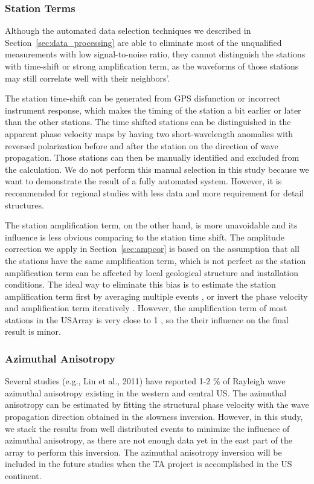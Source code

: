 \documentclass[referee]{gji}
\begin{document}
\subsubsection{Station Terms}

Although the automated data selection techniques we described in Section~\ref{sec:data_processing} are able to eliminate most of the unqualified measurements with low signal-to-noise ratio, they cannot distinguish the stations with time-shift or strong amplification term, as the waveforms of those stations may still correlate well with their neighbors’. 

The station time-shift can be generated from GPS disfunction or incorrect instrument response, which makes the timing of the station a bit earlier or later than the other stations. The time shifted stations can be distinguished in the apparent phase velocity maps by having two short-wavelength anomalies with reversed polarization before and after the station on the direction of wave propagation. Those stations can then be manually identified and excluded from the calculation. We do not perform this manual selection in this study because we want to demonstrate the result of a fully automated system. However, it is recommended for regional studies with less data and more requirement for detail structures.

The station amplification term, on the other hand, is more unavoidable and its influence is less obvious comparing to the station time shift.  The amplitude correction we apply in Section~\ref{sec:ampcor} is based on the assumption that all the stations have the same amplification term, which is not perfect as the station amplification term can be affected by local geological structure and installation conditions. The ideal way to eliminate this bias is to estimate the station amplification term first by averaging multiple events \cite{Eddy:2013la}, or invert the phase velocity and amplification term iteratively \cite{Lin:2012la}. However, the amplification term of most stations in the USArray is very close to 1 \cite{Eddy:2013la}, so the their influence on the final result is minor.

\subsubsection{Azimuthal Anisotropy}

Several studies (e.g., Lin et al., 2011) have reported 1-2 \% of Rayleigh wave azimuthal anisotropy existing in the western and central US. The azimuthal anisotropy can be estimated by fitting the structural phase velocity with the wave propagation direction obtained in the slowness inversion. However, in this study, we stack the results from well distributed events to minimize the influence of azimuthal anisotropy, as there are not enough data yet in the east part of the array to perform this inversion. The azimuthal anisotropy inversion will be included in the future studies when the TA project is accomplished in the US continent.
\end{document}
